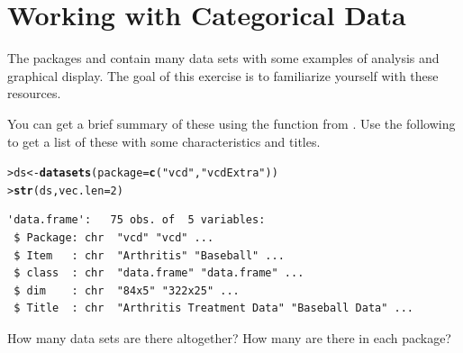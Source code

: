 \documentclass[10pt]{report}\usepackage[]{graphicx}\usepackage[]{color}
\makeatletter
\newcommand{\hlnum}[1]{\textcolor[rgb]{0.686,0.059,0.569}{#1}}%
\newcommand{\hlstr}[1]{\textcolor[rgb]{0.192,0.494,0.8}{#1}}%
\newcommand{\hlopt}[1]{\textcolor[rgb]{0,0,0}{#1}}%
\newcommand{\hlstd}[1]{\textcolor[rgb]{0.345,0.345,0.345}{#1}}%
\newcommand{\hlkwb}[1]{\textcolor[rgb]{0.69,0.353,0.396}{#1}}%
\newcommand{\hlkwc}[1]{\textcolor[rgb]{0.333,0.667,0.333}{#1}}%
\newcommand{\hlkwd}[1]{\textcolor[rgb]{0.737,0.353,0.396}{\textbf{#1}}}%
\newenvironment{kframe}{%
 \def\at@end@of@kframe{}%
 \ifinner\ifhmode%
  \def\at@end@of@kframe{\end{minipage}}%
  \begin{minipage}{\columnwidth}%
 \fi\fi%
 \def\FrameCommand##1{\hskip\@totalleftmargin \hskip-\fboxsep
 \colorbox{shadecolor}{##1}\hskip-\fboxsep
     \hskip-\linewidth \hskip-\@totalleftmargin \hskip\columnwidth}%
 \MakeFramed {\advance\hsize-\width
   \@totalleftmargin\z@ \linewidth\hsize
   \@setminipage}}%
 {\par\unskip\endMakeFramed%
 \at@end@of@kframe}
\newenvironment{knitrout}{}{} %
\renewenvironment{knitrout}{\small\renewcommand{\baselinestretch}{.85}}{} %
\makeatother
\begin{document}



\chapter{Working with Categorical Data}\label{ch:working}

\begin{Exercises}

\exercise The packages  and  contain many data sets with some
examples of analysis and graphical display.  The goal of this exercise is to
familiarize yourself with these resources.

You can get a brief summary of
these using the function  from .  Use the following to get a list of
these with some characteristics and titles.
\begin{knitrout}\footnotesize
{}\color{fgcolor}\begin{kframe}
\begin{alltt}
\hlstd{> }\hlstd{ds} \hlkwb{<-} \hlkwd{datasets}\hlstd{(}\hlkwc{package} \hlstd{=} \hlkwd{c}\hlstd{(}\hlstr{"vcd"}\hlstd{,} \hlstr{"vcdExtra"}\hlstd{))}
\hlstd{> }\hlkwd{str}\hlstd{(ds,} \hlkwc{vec.len} \hlstd{=} \hlnum{2}\hlstd{)}
\end{alltt}
\begin{verbatim}
'data.frame':	75 obs. of  5 variables:
 $ Package: chr  "vcd" "vcd" ...
 $ Item   : chr  "Arthritis" "Baseball" ...
 $ class  : chr  "data.frame" "data.frame" ...
 $ dim    : chr  "84x5" "322x25" ...
 $ Title  : chr  "Arthritis Treatment Data" "Baseball Data" ...
\end{verbatim}
\end{kframe}
\end{knitrout}
  \begin{enumerate*}
    \item How many data sets are there altogether?  How many are there in each package?
\end{enumerate*}
\end{Exercises}
\end{document}
